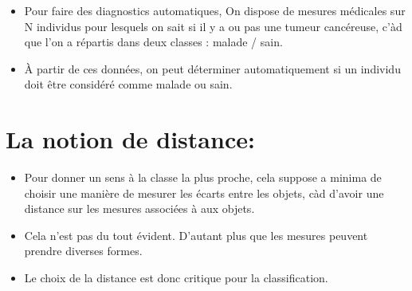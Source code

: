 \documentclass[letterpaper,10pt,english]{jupyterBook}
\begin{document}
\sphinxAtStartPar
{}
\begin{itemize}
\item {} 
\sphinxAtStartPar
Pour faire des diagnostics automatiques, On dispose de mesures médicales sur N individus pour lesquels on sait si il y a ou pas une tumeur cancéreuse, c’\sphinxhyphen{}à\sphinxhyphen{}d que l’on a répartis dans deux classes : malade / sain.

\item {} 
\sphinxAtStartPar
À partir de ces données, on peut déterminer automatiquement si un individu doit être considéré comme malade ou sain.

\end{itemize}


\section{La notion de distance:}
\label{\detokenize{notebooks/Machine-Learning/KNN-Cours:la-notion-de-distance}}\begin{itemize}
\item {} 
\sphinxAtStartPar
Pour donner un sens à la classe la plus proche, cela suppose a minima de choisir une manière de mesurer les écarts entre les objets, c\sphinxhyphen{}à\sphinxhyphen{}d d’avoir une distance sur les mesures associées à aux objets.

\item {} 
\sphinxAtStartPar
Cela n’est pas du tout évident. D’autant plus que les mesures peuvent prendre
diverses formes.

\item {} 
\sphinxAtStartPar
Le choix de la distance est donc critique pour la classification.

\end{itemize}
\end{document}
